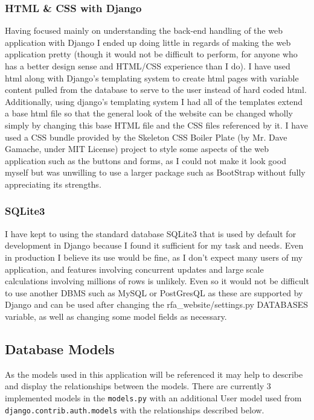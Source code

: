 \documentclass[11pt,a4paper]{article}
\begin{document}
\subsubsection{HTML \& CSS with Django}
Having focused mainly on understanding the back-end handling of the web application with Django I ended up doing little in regards of making the web application pretty (though it would not be difficult to perform, for anyone who has a better design sense and HTML/CSS experience than I do). I have used html along with Django's templating system to create html pages with variable content pulled from the database to serve to the user instead of hard coded html. Additionally, using django's templating system I had all of the templates extend a base html file so that the general look of the website can be changed wholly simply by changing this base HTML file and the CSS files referenced by it. I have used a CSS bundle provided by the Skeleton CSS Boiler Plate (by Mr. Dave Gamache, under MIT License) project to style some aspects of the web application such as the buttons and forms, as I could not make it look good myself but was unwilling to use a larger package such as BootStrap without fully appreciating its strengths.
 
\subsubsection{SQLite3}
I have kept to using the standard database SQLite3 that is used by default for development in Django because I found it sufficient for my task and needs. Even in production I believe its use would be fine, as I don't expect many users of my application, and features involving concurrent updates and large scale calculations involving millions of rows is unlikely. Even so it would not be difficult to use another DBMS such as MySQL or PostGresQL as these are supported by Django and can be used after changing the rfa\_website/settings.py DATABASES variable, as well as changing some model fields as necessary.

\subsection{Database Models}
As the models used in this application will be referenced it may help to describe and display the relationships between the models. There are currently 3 implemented models in the \verb|models.py| with an additional User model used from \verb|django.contrib.auth.models| with the relationships described below.
\end{document}
